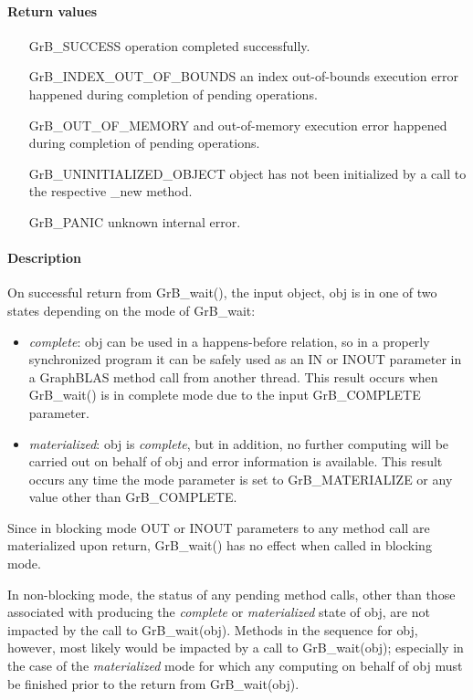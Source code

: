 \paragraph{Return values}
\begin{itemize}[leftmargin=2.3in]
	\item[{\sf GrB\_SUCCESS}]			operation completed successfully.
	\item[{\sf GrB\_INDEX\_OUT\_OF\_BOUNDS}]	an index out-of-bounds execution error happened during completion of pending operations.
	\item[{\sf GrB\_OUT\_OF\_MEMORY}]		and out-of-memory execution error happened during completion of pending operations.
	\item[{\sf GrB\_UNINITIALIZED\_OBJECT}]		object has not been initialized by a call to the respective {\sf *\_new} method.
	\item[{\sf GrB\_PANIC}]				unknown internal error.
\end{itemize}

\paragraph{Description}

On successful return from {\sf GrB\_wait()}, the input object, {\sf obj} is in one of two states depending on the mode of {GrB\_wait}: 
\begin{itemize}
\item \emph{complete}:  {\sf obj} can be used in a happens-before relation, so in a properly synchronized
program it can be safely used as an {\sf IN} or {\sf INOUT} parameter in a
GraphBLAS method call from another thread.  This result occurs when {GrB\_wait()} is in complete mode
due to the input {GrB\_COMPLETE} parameter.

\item \emph{materialized}:  {\sf obj} is \emph{complete}, but in addition, no further computing will be 
carried out on behalf of {\sf obj} and error information is available.   This result
occurs any time the mode parameter is set to {\sf GrB\_MATERIALIZE} or any value other than
{GrB\_COMPLETE}.
\end{itemize} 
Since in blocking mode {\sf OUT} or {\sf INOUT} parameters to any method call
are materialized upon return, {\sf GrB\_wait()} has no effect when called in blocking mode. 

In non-blocking mode, the status of any pending method calls, other than those associated with producing the
\emph{complete} or \emph{materialized} state of {\sf obj}, are not impacted by the call to {\sf GrB\_wait(obj)}.
Methods in the sequence for {\sf obj}, however, most likely would be impacted by a call to
{\sf GrB\_wait(obj)}; especially in the case of the \emph{materialized} mode for which any computing 
on behalf of {\sf obj} must be finished prior to the return from {\sf GrB\_wait(obj)}.  

